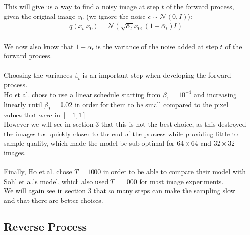 \documentclass{article}
\begin{document}
This will give us a way to find a noisy image at step $t$ of the forward process, given the original image $x_0$ (we ignore the noise $\bar{\epsilon} \sim \mathcal{N}\left(0, I\right)$):
\begin{gather}
  q\left(x_t | x_0\right) = \mathcal{N}\left(\sqrt{\bar{\alpha}_t} x_0, \left(1 - \bar{\alpha}_t\right)I\right) \label{eq:4}
\end{gather}
\\
We now also know that $1 - \bar{\alpha}_t$ is the variance of the noise added at step $t$ of the forward process. \cite{nichol2021improved}
\\\\
Choosing the variances $\beta_t$ is an important step when developing the forward process. \\
Ho et al. \cite{ho2020denoising} chose to use a linear schedule starting from $\beta_1 = 10^{-4}$ and increasing linearly until $\beta_T = 0.02$ in order for them to be small compared to the pixel values that were in $\left[-1, 1\right]$. \cite{ho2020denoising} \\
However we will see in section 3 that this is not the best choice, as this destroyed the images too quickly closer to the end of the process while providing little to sample quality, which made the model be sub-optimal for $64 \times 64$ and $32 \times 32$ images. \cite{nichol2021improved}
\\\\
Finally, Ho et al. \cite{ho2020denoising} chose $T = 1000$ in order to be able to compare their model with Sohl et al.'s \cite{sohldickstein2015deep} model, which also used $T = 1000$ for most image experiments. \\
We will again see in section 3 that so many steps can make the sampling slow and that there are better choices. \cite{nichol2021improved}
\subsection{Reverse Process}
\end{document}
